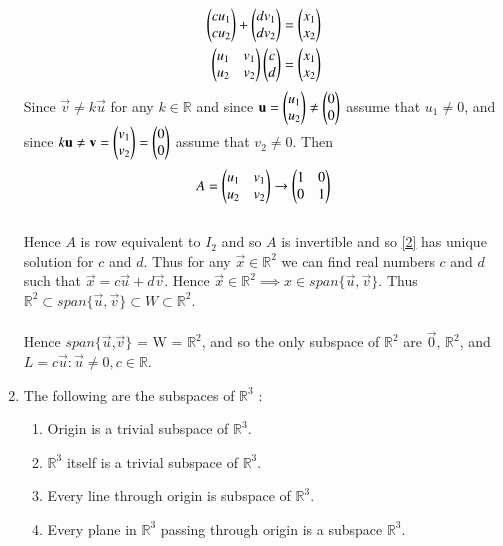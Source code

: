 \documentclass[journal,12pt,twocolumn]{IEEEtran}
\begin{document}
\begin{enumerate}[label=\alph*.]
\begin{align}
	\label{1}\begin{pmatrix}cu_1\\cu_2\end{pmatrix} + \begin{pmatrix}dv_1\\dv_2\end{pmatrix} = \begin{pmatrix}x_1\\x_2\end{pmatrix}\\
	\label{2}\begin{pmatrix}u_1 & v_1\\u_2 & v_2\end{pmatrix}\begin{pmatrix}c\\d\end{pmatrix} = \begin{pmatrix}x_1\\x_2\end{pmatrix}
\end{align}
Since $\vec{v} \neq k\vec{u}$ for any $k \in \mathbb{R}$ and since $\mathbf{u} = \begin{pmatrix}u_1 \\ u_2\end{pmatrix} \neq \begin{pmatrix}0\\0\end{pmatrix}$ assume that $u_1 \neq 0$, and since $k\mathbf{u} \neq \mathbf{v} = \begin{pmatrix}v_1\\v_2\end{pmatrix} = \begin{pmatrix}0\\0\end{pmatrix}$ assume that $v_2 \neq 0$. Then
\begin{align}\label{3}
	A = \begin{pmatrix}u_1 & v_1\\u_2 & v_2\end{pmatrix} \rightarrow \begin{pmatrix}1 & 0\\0 & 1\end{pmatrix}
\end{align}
\\
Hence $A$ is row equivalent to $I_2$ and so $A$ is invertible and so \eqref{2} has unique solution for $c$ and $d$. Thus for any $\vec{x} \in \mathbb{R}^2$ we can find real numbers $c$ and $d$ such that $\vec{x} = c\vec{u} + d\vec{v}$. Hence $\vec{x} \in \mathbb{R}^2 \implies x \in span\{\vec{u},\vec{v}\}$. Thus $\mathbb{R}^2 \subset span\{\vec{u},\vec{v}\} \subset W \subset \mathbb{R}^2$.\\
\\
Hence $span\{ \vec{u}$,$\vec{v} \}$ = W = $\mathbb{R}^2$, and so the only subspace of $\mathbb{R}^2$ are ${\vec{0}}$, $\mathbb{R}^2$, and $L = {c\vec{u} : \vec{u} \neq 0, c \in \mathbb{R}}$.
\\
\item
The following are the subspaces of $\mathbb{R}^3$ :
\begin{enumerate}[label=\arabic*.]
\item
Origin is a trivial subspace of $\mathbb{R}^3$.\\
\item
$\mathbb{R}^3$ itself is a trivial subspace of $\mathbb{R}^3$.\\
\item
Every line through origin is subspace of $\mathbb{R}^3$.\\
\item
Every plane in $\mathbb{R}^3$ passing through origin is a subspace $\mathbb{R}^3$.\\

\end{enumerate}
\end{enumerate}
\end{document}
